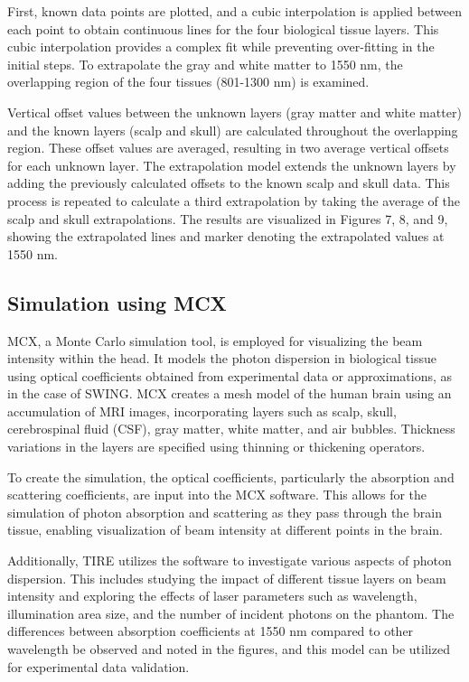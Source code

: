 \documentclass[journal,twoside,web]{ieeecolor}
\begin{document}
First, known data points are plotted, and a cubic interpolation is applied between each point to obtain continuous lines for the four biological tissue layers. This cubic interpolation provides a complex fit while preventing over-fitting in the initial steps. To extrapolate the gray and white matter to 1550 nm, the overlapping region of the four tissues (801-1300 nm) is examined.

Vertical offset values between the unknown layers (gray matter and white matter) and the known layers (scalp and skull) are calculated throughout the overlapping region. These offset values are averaged, resulting in two average vertical offsets for each unknown layer. The extrapolation model extends the unknown layers by adding the previously calculated offsets to the known scalp and skull data. This process is repeated to calculate a third extrapolation by taking the average of the scalp and skull extrapolations. The results are visualized in Figures 7, 8, and 9, showing the extrapolated lines and marker denoting the extrapolated values at 1550 nm.

\subsection{Simulation using MCX}
MCX, a Monte Carlo simulation tool, is employed for visualizing the beam intensity within the head. It models the photon dispersion in biological tissue using optical coefficients obtained from experimental data or approximations, as in the case of SWING. MCX creates a mesh model of the human brain using an accumulation of MRI images, incorporating layers such as scalp, skull, cerebrospinal fluid (CSF), gray matter, white matter, and air bubbles. Thickness variations in the layers are specified using thinning or thickening operators.

To create the simulation, the optical coefficients, particularly the absorption and scattering coefficients, are input into the MCX software. This allows for the simulation of photon absorption and scattering as they pass through the brain tissue, enabling visualization of beam intensity at different points in the brain.

Additionally, TIRE utilizes the software to investigate various aspects of photon dispersion. This includes studying the impact of different tissue layers on beam intensity and exploring the effects of laser parameters such as wavelength, illumination area size, and the number of incident photons on the phantom.  The differences between absorption coefficients at 1550 nm compared to other wavelength be observed and noted in the figures, and this model can be utilized for experimental data validation.
\end{document}
